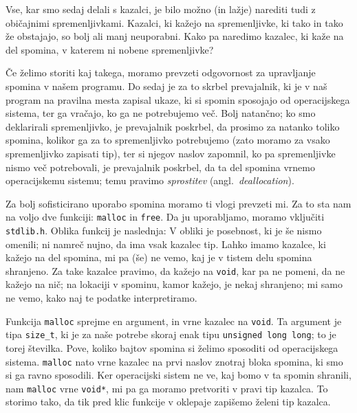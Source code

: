 \begin{examples}
\end{examples}

Vse, kar smo sedaj delali s kazalci, je bilo možno (in lažje) narediti tudi z
običajnimi spremenljivkami. Kazalci, ki kažejo na spremenljivke, ki tako in tako
že obstajajo, so bolj ali manj neuporabni. Kako pa naredimo kazalec, ki kaže
na del spomina, v katerem ni nobene spremenljivke?

Če želimo storiti kaj takega, moramo prevzeti odgovornost za upravljanje spomina
v našem programu. Do sedaj je za to skrbel prevajalnik, ki je v naš program na
pravilna mesta zapisal ukaze, ki si spomin sposojajo od operacijskega sistema,
ter ga vračajo, ko ga ne potrebujemo več. Bolj natančno; ko smo deklarirali
spremenljivko, je prevajalnik poskrbel, da prosimo za natanko toliko spomina,
kolikor ga za to spremenljivko potrebujemo (zato moramo za vsako spremenljivko
zapisati tip), ter si njegov naslov zapomnil,
ko pa spremenljivke nismo več potrebovali, je prevajalnik poskrbel, da ta del
spomina vrnemo operacijskemu sistemu; temu pravimo \emph{sprostitev}
(angl.~\textit{deallocation}).

Za bolj sofisticirano uporabo spomina moramo ti vlogi prevzeti mi. Za to sta
nam na voljo dve funkciji: \verb+malloc+ in \verb+free+. Da ju uporabljamo,
moramo vključiti \verb+stdlib.h+.
Oblika funkcij je naslednja:
V obliki je posebnost, ki je še nismo omenili; ni namreč nujno, da ima vsak
kazalec tip. Lahko imamo kazalce, ki kažejo na del spomina, mi pa (še) ne vemo,
kaj je v tistem delu spomina shranjeno. Za take kazalce pravimo, da kažejo
na \verb+void+, kar pa ne pomeni, da ne kažejo na nič; na lokaciji v spominu,
kamor kažejo, je nekaj shranjeno; mi samo ne vemo, kako naj te podatke
interpretiramo.

Funkcija \verb+malloc+ sprejme en argument, in vrne kazalec na \verb+void+.
Ta argument je tipa \verb+size_t+, ki je za naše potrebe skoraj enak tipu
\verb+unsigned long long+; to je torej številka. Pove, koliko bajtov spomina si
želimo sposoditi od operacijskega sistema. \verb+malloc+ nato vrne kazalec na
prvi naslov znotraj bloka spomina, ki smo si ga ravno sposodili. Ker operacijski
sistem ne ve, kaj bomo v ta spomin shranili, nam \verb+malloc+ vrne \verb+void*+,
mi pa ga moramo pretvoriti v pravi tip kazalca. To storimo tako, da tik pred
klic funkcije v oklepaje zapišemo želeni tip kazalca.

